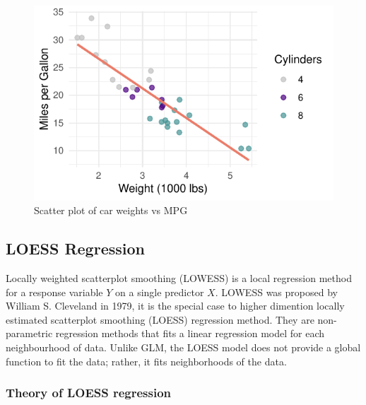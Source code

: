\documentclass{article}\usepackage[]{graphicx}\usepackage[]{xcolor}
\makeatletter
\def\maxwidth{ %
  \ifdim\Gin@nat@width>\linewidth
    \linewidth
  \else
    \Gin@nat@width
  \fi
}
\newenvironment{knitrout}{}{} %
\numberwithin{equation}{section}
\makeatother
\begin{document}
\begin{knitrout}\scriptsize
{}\color{fgcolor}\begin{figure}[H]

{\centering \includegraphics[width=\maxwidth]{figure/beamer-scatter-plot-1} 

}

\caption[Scatter plot of car weights vs MPG]{Scatter plot of car weights vs MPG}\label{fig:scatter-plot}
\end{figure}

\end{knitrout}

\subsection{LOESS Regression}
\noindent
Locally weighted scatterplot smoothing (LOWESS) is a local regression method for a response variable $Y$ on a single predictor $X$. LOWESS was proposed by William S. Cleveland in 1979, it is the special case to higher dimention locally estimated scatterplot smoothing (LOESS) regression method. They are non-parametric regression methods that fits a linear regression model for each neighbourhood of data. Unlike GLM, the LOESS model does not provide a global function to fit the data; rather, it fits neighborhoods of the data.\\

\noindent
\subsubsection{Theory of LOESS regression}\\
\end{document}
